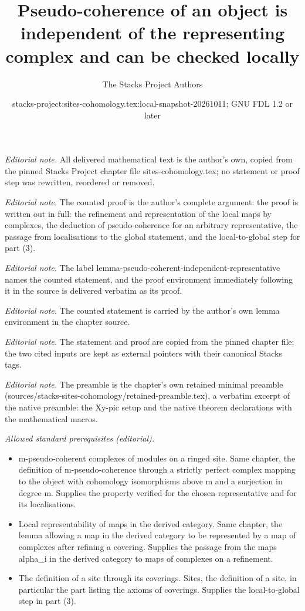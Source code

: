 \documentclass[10pt,a4paper]{amsart}
\title{Pseudo-coherence of an object is independent of the representing complex and can be checked locally}
\author{The Stacks Project Authors}
\date{stacks-project:sites-cohomology.tex:local-snapshot-20261011; GNU FDL 1.2 or later}
\theoremstyle{plain}
\theoremstyle{definition}
\theoremstyle{remark}
\numberwithin{equation}{subsection}
\begin{document}
\maketitle
\noindent\textit{Editorial note.} All delivered mathematical text is the author's own, copied from the pinned Stacks Project chapter file sites-cohomology.tex; no statement or proof step was rewritten, reordered or removed.\par\medskip
\noindent\textit{Editorial note.} The counted proof is the author's complete argument: the proof is written out in full: the refinement and representation of the local maps by complexes, the deduction of pseudo-coherence for an arbitrary representative, the passage from localisations to the global statement, and the local-to-global step for part (3).\par\medskip
\noindent\textit{Editorial note.} The label lemma-pseudo-coherent-independent-representative names the counted statement, and the proof environment immediately following it in the source is delivered verbatim as its proof.\par\medskip
\noindent\textit{Editorial note.} The counted statement is carried by the author's own lemma environment in the chapter source.\par\medskip
\noindent\textit{Editorial note.} The statement and proof are copied from the pinned chapter file; the two cited inputs are kept as external pointers with their canonical Stacks tags.\par\medskip
\noindent\textit{Editorial note.} The preamble is the chapter's own retained minimal preamble (sources/stacks-sites-cohomology/retained-preamble.tex), a verbatim excerpt of the native preamble: the Xy-pic setup and the native theorem declarations with the mathematical macros.\par\medskip
\noindent\textit{Allowed standard prerequisites (editorial).}\begin{itemize}
\item m-pseudo-coherent complexes of modules on a ringed site. Same chapter, the definition of m-pseudo-coherence through a strictly perfect complex mapping to the object with cohomology isomorphisms above m and a surjection in degree m. Supplies the property verified for the chosen representative and for its localisations.
\item Local representability of maps in the derived category. Same chapter, the lemma allowing a map in the derived category to be represented by a map of complexes after refining a covering. Supplies the passage from the maps alpha\_i in the derived category to maps of complexes on a refinement.
\item The definition of a site through its coverings. Sites, the definition of a site, in particular the part listing the axioms of coverings. Supplies the local-to-global step in part (3).
\end{itemize}\medskip
\end{document}
